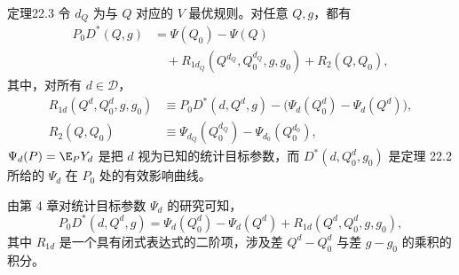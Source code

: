 \begin{bookresult}{定理}{22.3}
令 $d_Q$ 为与 $Q$ 对应的 $V$ 最优规则。对任意 $Q,g$，都有
\[
\begin{aligned}
 P_0D^*(Q,g)
 &=\Psi(Q_0)-\Psi(Q)\\
 &\quad+R_{1d_Q}(Q^{d_Q},Q_0^{d_Q},g,g_0)+R_2(Q,Q_0),
\end{aligned}
\]
其中，对所有 $d\in\mathcal D$，
\[
\begin{aligned}
 R_{1d}(Q^d,Q_0^d,g,g_0)
 &\equiv P_0D^*(d,Q^d,g)-\bigl(\Psi_d(Q_0^d)-\Psi_d(Q^d)\bigr),\\
 R_2(Q,Q_0)
 &\equiv\Psi_{d_Q}(Q_0^{d_Q})-\Psi_{d_0}(Q_0^{d_0}),
\end{aligned}
\]
$\Psi_d(P)=\E_PY_d$ 是把 $d$ 视为已知的统计目标参数，而 $D^*(d,Q_0^d,g_0)$ 是定理 22.2 所给的 $\Psi_d$ 在 $P_0$ 处的有效影响曲线。
\end{bookresult}

由第 4 章对统计目标参数 $\Psi_d$ 的研究可知，
\[
 P_0D^*(d,Q^d,g)
 =\Psi_d(Q_0^d)-\Psi_d(Q^d)+R_{1d}(Q^d,Q_0^d,g,g_0),
\]
其中 $R_{1d}$ 是一个具有闭式表达式的二阶项，涉及差 $Q^d-Q_0^d$ 与差 $g-g_0$ 的乘积的积分。
